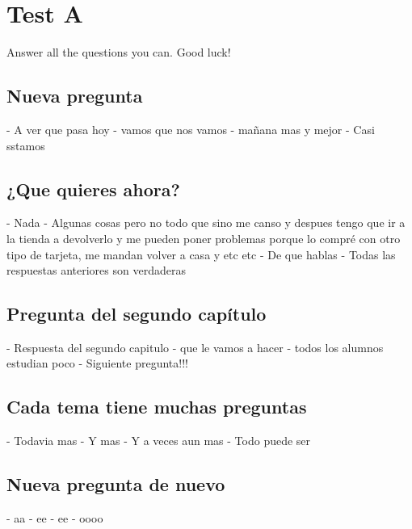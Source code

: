 \documentclass{article}%
\begin{document}
%
\normalsize%
\section{Test A}%
Answer all the questions you can. Good luck!%
\subsection{Nueva pregunta}%
{-} A ver que pasa hoy \newline%
%
{-} vamos que nos vamos \newline%
%
{-} mañana mas y mejor \newline%
%
{-} Casi sstamos \newline%

%
\subsection{¿Que quieres ahora?}%
{-} Nada \newline%
%
{-} Algunas cosas pero no todo que sino me canso y despues tengo que ir a la tienda a devolverlo y me pueden poner problemas porque lo compré con otro tipo de tarjeta, me mandan volver a casa y etc etc \newline%
%
{-} De que hablas \newline%
%
{-} Todas las respuestas anteriores son verdaderas \newline%

%
\subsection{Pregunta del segundo capítulo}%
{-} Respuesta del segundo capitulo \newline%
%
{-} que le vamos a hacer \newline%
%
{-} todos los alumnos estudian poco \newline%
%
{-} Siguiente pregunta!!! \newline%

%
\subsection{Cada tema tiene muchas preguntas}%
{-} Todavia mas \newline%
%
{-} Y mas \newline%
%
{-} Y a veces aun mas \newline%
%
{-} Todo puede ser \newline%

%
\subsection{Nueva pregunta de nuevo}%
{-} aa \newline%
%
{-} ee \newline%
%
{-} ee \newline%
%
{-} oooo \newline%
\end{document}
